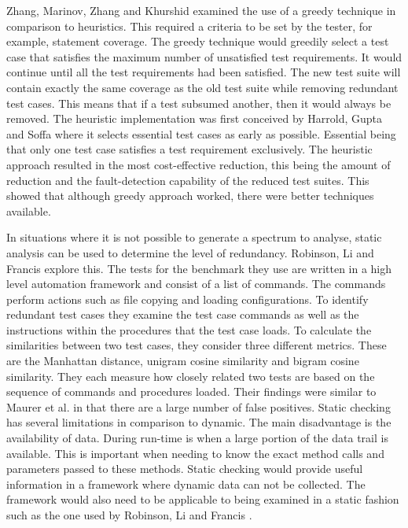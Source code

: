 Zhang, Marinov, Zhang and Khurshid \cite{zhang2011empirical} examined the use of a greedy technique in comparison to heuristics. This required a criteria to be set by the tester, for example, statement coverage. The greedy technique would greedily select a test case that satisfies the maximum number of unsatisfied test requirements. It would continue until all the test requirements had been satisfied. The new test suite will contain exactly the same coverage as the old test suite while removing redundant test cases. This means that if a test subsumed another, then it would always be removed. The heuristic implementation was first conceived by Harrold, Gupta and Soffa \cite{harrold1993methodology} where it selects essential test cases as early as possible. Essential being that only one test case satisfies a test requirement exclusively. The heuristic approach resulted in the most cost-effective reduction, this being the amount of reduction and the fault-detection capability of the reduced test suites. This showed that although greedy approach worked, there were better techniques available.

In situations where it is not possible to generate a spectrum to analyse, static analysis can be used to determine the level of redundancy. Robinson, Li and Francis \cite{li2008static} explore this. The tests for the benchmark they use are written in a high level automation framework and consist of a list of commands. The commands perform actions such as file copying and loading configurations. To identify redundant test cases they examine the test case commands as well as the instructions within the procedures that the test case loads. To calculate the similarities between two test cases, they consider three different metrics. These are the Manhattan distance, unigram cosine similarity and bigram cosine similarity. They each measure how closely related two tests are based on the sequence of commands and procedures loaded. Their findings were similar to Maurer et al. \cite{koochakzadeh2009test} in that there are a large number of false positives. Static checking has several limitations in comparison to dynamic. The main disadvantage is the availability of data. During run-time is when a large portion of the data trail is available. This is important when needing to know the exact method calls and parameters passed to these methods. Static checking would provide useful information in a framework where dynamic data can not be collected. The framework would also need to be applicable to being examined in a static fashion such as the one used by Robinson, Li and Francis \cite{li2008static}.

